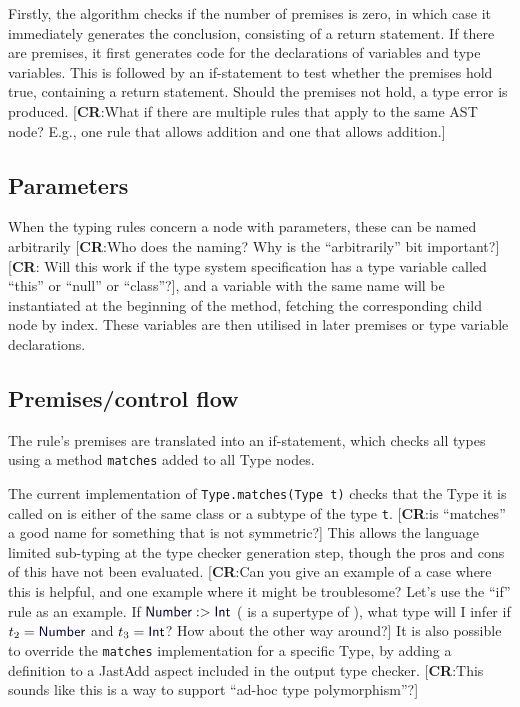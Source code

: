 \documentclass[nofilelist]{cslthse-msc}
\newcommand{\CR}[1]{\textcolor{green!60!black}{[\textbf{CR}:#1]}}
\begin{document}
Firstly, the algorithm checks if the number of premises is zero, in which case it immediately generates the conclusion, consisting of a return statement.
If there are premises, it first generates code for the declarations of variables and type variables.
This is followed by an if-statement to test whether the premises hold true, containing a return statement.
Should the premises not hold, a type error is produced.
\CR{What if there are multiple rules that apply to the same AST node?  E.g., one rule that allows \ty{Int} addition and one that allows \ty{String} addition.}

\subsection{Parameters}
When the typing rules concern a node with parameters, these can be named arbitrarily \CR{Who does the naming?  Why is the ``arbitrarily'' bit important?}\CR{ Will this work if the type system specification has a type variable called ``this'' or ``null'' or ``class''?}, and a variable with the same name will be instantiated at the beginning of the method, fetching the corresponding child node by index.
These variables are then utilised in later premises or type variable declarations.

\subsection{Premises/control flow}
The rule's premises are translated into an if-statement, which checks all types using a method \verb|matches| added to all Type nodes.

The current implementation of \verb|Type.matches(Type t)| checks that the Type it is called on is either of the same class or a subtype of the type \verb|t|.
\CR{is ``matches'' a good name for something that is not symmetric?}
This allows the language limited sub-typing at the type checker generation step, though the pros and cons of this have not been evaluated.
\CR{Can you give an example of a case where this is helpful, and one example where it might be troublesome?
Let's use the ``if'' rule as an example.  If $\ty{Number} :> \ty{Int}$ (\ty{Number} is a supertype of \ty{Int}), what type will I infer if $t_2 = \ty{Number}$ and $t_3 = \ty{Int}$?  How about the other way around?}
It is also possible to override the \verb|matches| implementation for a specific Type, by adding a definition to a JastAdd aspect included in the output type checker.
\CR{This sounds like this is a way to support ``ad-hoc type polymorphism''?}
\end{document}
